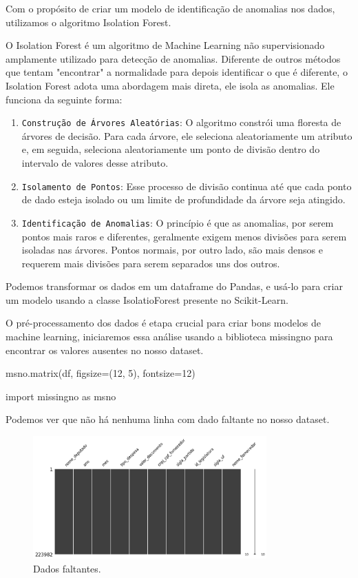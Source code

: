 \documentclass[12pt, a4paper]{article}
\begin{document}
Com o propósito de criar um modelo de identificação de anomalias nos dados, utilizamos o algoritmo Isolation Forest\cite{Scikit-Learn}.

O Isolation Forest é um algoritmo de Machine Learning não supervisionado amplamente utilizado para detecção de anomalias. Diferente de outros métodos que tentam "encontrar" a normalidade para depois identificar o que é diferente, o Isolation Forest adota uma abordagem mais direta, ele isola as anomalias. Ele funciona da seguinte forma\cite{isolation-forest}:

\begin{enumerate}
	\item \texttt{Construção de Árvores Aleatórias}: O algoritmo constrói uma floresta de árvores de decisão. Para cada árvore, ele seleciona aleatoriamente um atributo e, em seguida, seleciona aleatoriamente um ponto de divisão dentro do intervalo de valores desse atributo.
	\item \texttt{Isolamento de Pontos}: Esse processo de divisão continua até que cada ponto de dado esteja isolado ou um limite de profundidade da árvore seja atingido.
	\item \texttt{Identificação de Anomalias}: O princípio é que as anomalias, por serem pontos mais raros e diferentes, geralmente exigem menos divisões para serem isoladas nas árvores. Pontos normais, por outro lado, são mais densos e requerem mais divisões para serem separados uns dos outros.
\end{enumerate}

Podemos transformar os dados em um dataframe do Pandas\cite{Pandas}, e usá-lo para criar um modelo usando a classe IsolatioForest presente no Scikit-Learn\cite{Scikit-Learn}.

O pré-processamento dos dados é etapa crucial para criar bons modelos de machine learning, iniciaremos essa análise usando a biblioteca missingno para encontrar os valores ausentes no nosso dataset.

\begin{python}
msno.matrix(df, figsize=(12, 5), fontsize=12)

import missingno as msno
\end{python}

Podemos ver que não há nenhuma linha com dado faltante no nosso dataset.

\begin{figure}[!htbp]
	\centering
	\includegraphics[width=0.8\textwidth]{assets/3_plot1.png}
	\caption{Dados faltantes.}
	\label{fig:dados faltantes}
\end{figure}
\end{document}
